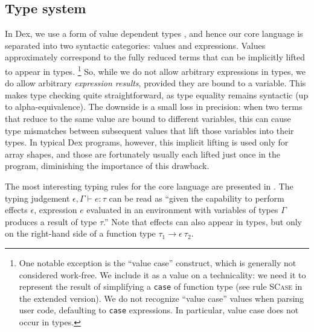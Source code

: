 \documentclass[acmsmall,screen,nonacm]{acmart}
\newcommand{\ttt}[1]{\texttt{#1}}
\newcommand{\tsc}[1]{\textsc{#1}}
\newif\ifextended
\begin{document}
\subsection{Type system}
\label{sec:formal-type-system}
In Dex, we use a form of value dependent types \cite{swamy2011valuedependent}, and hence our core language is separated into two syntactic categories: values and expressions.
Values approximately correspond to the fully reduced terms that can be implicitly lifted to appear in types.%
\footnote{One notable exception is the ``value case'' construct, which is generally not considered work-free.  We include it as a value on a technicality: we need it to represent the result of simplifying a \ttt{case} of function type (see rule \tsc{SCase} in \ifextended \Cref{fig:defunctionalization-full}\else the extended version\fi).  We do not recognize ``value case'' values when parsing user code, defaulting to \ttt{case} expressions.  In particular, value case does not occur in types.} %
So, while we do not allow arbitrary expressions in types, we do allow arbitrary \emph{expression results}, provided they are bound to a variable.
This makes type checking quite straightforward, as type equality remains syntactic (up to alpha-equivalence).
The downside is a small loss in precision: when two terms that reduce to the same value are bound to different variables, this can cause type mismatches between subsequent values that lift those variables into their types.
In typical Dex programs, however, this implicit lifting is used only for array shapes, and those are fortunately usually each lifted just once in the program, diminishing the importance of this drawback.

The most interesting typing rules for the core language are presented in .
The typing judgement $\epsilon, \Gamma \vdash e: \tau$ can be read as ``given the capability to perform effects $\epsilon$, expression $e$ evaluated in an environment with variables of types $\Gamma$ produces a result of type $\tau$.''
Note that effects can also appear in types, but only on the right-hand side of a function type $\tau_1 \rightarrow \epsilon\ \tau_2$.


\end{document}

